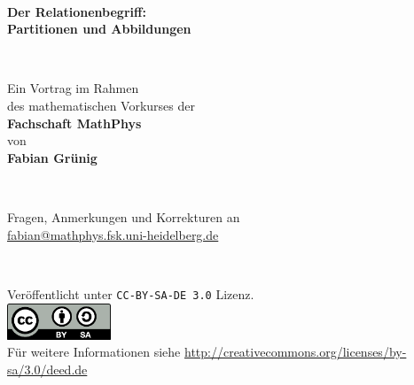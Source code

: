 
\begin{titlepage}

~

\begin{center}
  {\Huge \textbf{Der Relationenbegriff: \\[2ex] Partitionen und Abbildungen}}
\end{center}

~\vfill~

\begin{center}
  \begin{center}
    Ein Vortrag im Rahmen \\[0.5ex] des mathematischen Vorkurses der\\[0.5ex]
    \textbf{Fachschaft MathPhys}\\[0.5ex]
    von\\[0.5ex]
    \textbf{Fabian Grünig}
  \end{center}
\end{center}

~\vfill~

\begin{center}
    Fragen, Anmerkungen und Korrekturen an\\[1ex]
    \textsf{\href{mailto:fabian@mathphys.fsk.uni-heidelberg.de}{fabian@mathphys.fsk.uni-heidelberg.de}}
\end{center}

\end{titlepage}


\newpage

\thispagestyle{empty}

\tableofcontents

~\vfill~

\begin{center}
Veröffentlicht unter \texttt{CC-BY-SA-DE 3.0} Lizenz.
\vspace{0.5cm}\\
  \includegraphics[height=31pt,width=88pt]{license.pdf}
\vspace{0.5cm}\\
Für weitere Informationen siehe
\url{http://creativecommons.org/licenses/by-sa/3.0/deed.de}
\end{center}

\newpage
